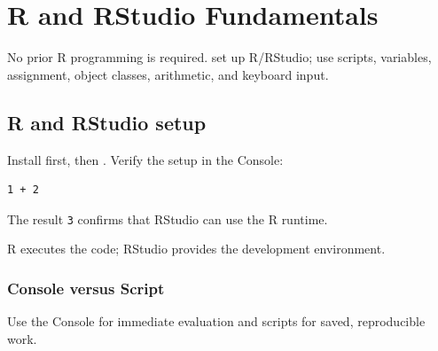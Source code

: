 \chapter{R and RStudio Fundamentals}
\label{chap:r-basics}

\chapterguide
  {No prior R programming is required.}
  {set up R/RStudio; use scripts, variables, assignment, object classes, arithmetic, and keyboard input.}

\section{R and RStudio setup}

Install  first, then . Verify the setup in the Console:

\begin{lstlisting}[style=dsr]
1 + 2
\end{lstlisting}

The result \texttt{3} confirms that RStudio can use the R runtime.

\begin{keyidea}
R executes the code; RStudio provides the development environment.
\end{keyidea}

\subsection{Console versus Script}

Use the Console for immediate evaluation and scripts for saved, reproducible work.

